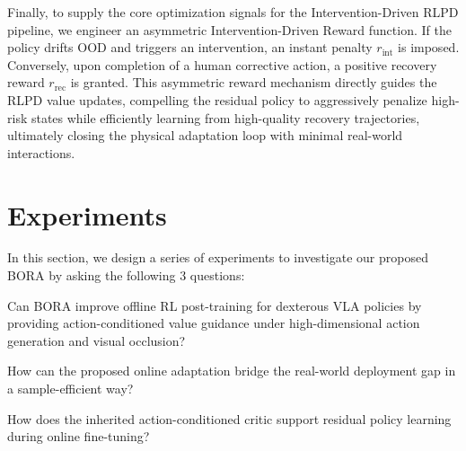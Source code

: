 \documentclass{article}
\begin{document}
Finally, to supply the core optimization signals for the Intervention-Driven RLPD pipeline, we engineer an asymmetric Intervention-Driven Reward function. If the policy drifts OOD and triggers an intervention, an instant penalty $r_{\text{int}}$ is imposed. Conversely, upon completion of a human corrective action, a positive recovery reward $r_{\text{rec}}$ is granted. This asymmetric reward mechanism directly guides the RLPD value updates, compelling the residual policy to aggressively penalize high-risk states while efficiently learning from high-quality recovery trajectories, ultimately closing the physical adaptation loop with minimal real-world interactions.

\vspace{-2.5mm}
\section{Experiments}
\label{sec:experiments}
\vspace{-1.5mm}
In this section, we design a series of experiments to investigate our proposed BORA by asking the following 3 questions:

\begin{description}[nosep, leftmargin=1.2cm, labelwidth=1cm]
    \item[\textbf{RQ1:}] Can BORA improve offline RL post-training for dexterous VLA policies by providing action-conditioned value guidance under high-dimensional action generation and visual occlusion?

    \item[\textbf{RQ2:}] How can the proposed online adaptation bridge the real-world deployment gap in a sample-efficient way?
    \item[\textbf{RQ3:}] How does the inherited action-conditioned critic support residual policy learning during online fine-tuning?
\end{description}



\end{document}
